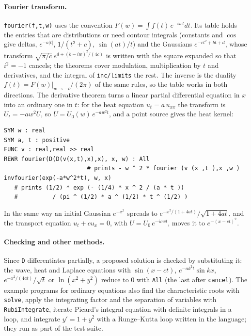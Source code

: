 \documentclass[11pt,a4paper]{article}
\begin{document}
\paragraph{Fourier transform.} \texttt{fourier(f,t,w)} uses the convention
$F(w)=\int f(t)\,e^{-iwt}dt$. Its table holds the entries that are
distributions or need contour integrals (constants and $\cos$ give deltas,
$e^{-a|t|}$, $1/(t^2+c)$, $\sin(at)/t$) and the Gaussians
$e^{-ct^2+bt+d}$, whose transform
$\sqrt{\pi/c}\,e^{d+(b-iw)^2/(4c)}$ is written with the square expanded so
that $i^2=-1$ cancels; the theorems cover modulation, multiplication by
$t$ and derivatives, and the integral of \texttt{inc/limits} the rest. The
inverse is the duality $f(t)=F(w)|_{w\to-t}/(2\pi)$ of the same rules, so
the table works in both directions. The derivative theorem turns a linear
partial differential equation in $x$ into an ordinary one in $t$: for the
heat equation $u_t=a\,u_{xx}$ the transform is $U_t=-aw^2U$, so
$U=U_0(w)\,e^{-aw^2t}$, and a point source gives the heat kernel:

\begin{lstlisting}
SYM w : real
SYM a, t : positive
FUNC v : real,real >> real
REWR fourier(D(D(v(x,t),x),x), x, w) : All
                        # prints - w ^ 2 * fourier (v (x ,t ),x ,w )
invfourier(exp(-a*w^2*t), w, x)
   # prints (1/2) * exp (- (1/4) * x ^ 2 / (a * t ))
   #          / (pi ^ (1/2) * a ^ (1/2) * t ^ (1/2) )
\end{lstlisting}

In the same way an initial Gaussian $e^{-x^2}$ spreads to
$e^{-x^2/(1+4at)}/\sqrt{1+4at}$, and the transport equation
$u_t+cu_x=0$, with $U=U_0\,e^{-icwt}$, moves it to $e^{-(x-ct)^2}$.

\paragraph{Checking and other methods.} Since \texttt{D} differentiates
partially, a proposed solution is checked by substituting it: the wave,
heat and Laplace equations with $\sin(x-ct)$, $e^{-ak^2t}\sin kx$,
$e^{-x^2/(4at)}/\sqrt t$ or $\ln(x^2+y^2)$ reduce to 0 with \texttt{All}
(the last after \texttt{cancel}). The example programs for ordinary
equations also find the characteristic roots with \texttt{solve}, apply
the integrating factor and the separation of variables with
\texttt{RubiIntegrate}, iterate Picard's integral equation with definite
integrals in a loop, and integrate $y'=1+y^2$ with a Runge--Kutta loop
written in the language; they run as part of the test suite.
\end{document}
